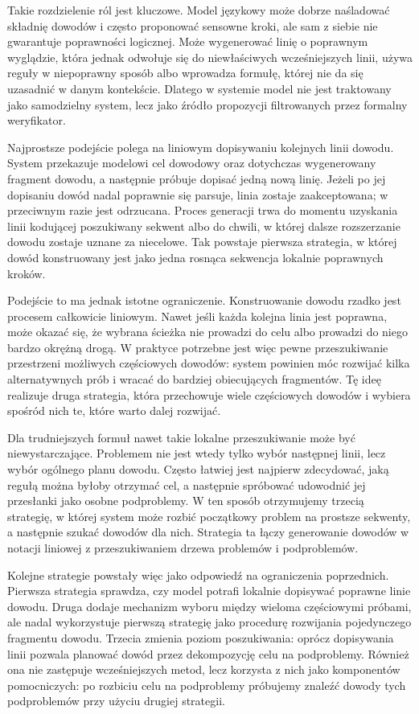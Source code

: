 \documentclass[shortabstract]{iithesis}
\theoremstyle{definition}
\theoremstyle{remark}
\theoremstyle{plain}
\begin{document}
Takie rozdzielenie ról jest kluczowe. Model językowy może dobrze naśladować składnię
dowodów i często proponować sensowne kroki, ale sam z siebie nie gwarantuje
poprawności logicznej. Może wygenerować linię o poprawnym wyglądzie, która jednak
odwołuje się do niewłaściwych wcześniejszych linii, używa reguły w niepoprawny
sposób albo wprowadza formułę, której nie da się uzasadnić w danym kontekście.
Dlatego w systemie model nie jest traktowany jako samodzielny system, lecz jako źródło
propozycji filtrowanych przez formalny weryfikator.

Najprostsze podejście polega na liniowym dopisywaniu kolejnych linii dowodu.
System przekazuje modelowi cel dowodowy oraz dotychczas wygenerowany fragment
dowodu, a następnie próbuje dopisać jedną nową linię. Jeżeli po jej dopisaniu dowód
nadal poprawnie się parsuje, linia zostaje zaakceptowana; w przeciwnym razie jest
odrzucana. Proces generacji trwa do momentu uzyskania linii kodującej poszukiwany
sekwent albo do chwili, w której dalsze rozszerzanie dowodu zostaje uznane za
niecelowe. Tak powstaje pierwsza strategia, w której dowód konstruowany jest jako
jedna rosnąca sekwencja lokalnie poprawnych kroków.

Podejście to ma jednak istotne ograniczenie. Konstruowanie dowodu rzadko jest
procesem całkowicie liniowym. Nawet jeśli każda kolejna linia jest poprawna, może
okazać się, że wybrana ścieżka nie prowadzi do celu albo prowadzi do niego bardzo
okrężną drogą. W praktyce potrzebne jest więc pewne przeszukiwanie przestrzeni
możliwych częściowych dowodów: system powinien móc rozwijać kilka alternatywnych
prób i wracać do bardziej obiecujących fragmentów. Tę ideę realizuje druga
strategia, która przechowuje wiele częściowych dowodów i wybiera spośród nich te,
które warto dalej rozwijać.

Dla trudniejszych formuł nawet takie lokalne przeszukiwanie może być niewystarczające.
Problemem nie jest wtedy tylko wybór następnej linii, lecz wybór ogólnego planu
dowodu. Często łatwiej jest najpierw zdecydować, jaką regułą można byłoby otrzymać
cel, a następnie spróbować udowodnić jej przesłanki jako osobne podproblemy. W ten
sposób otrzymujemy trzecią strategię, w której system może rozbić początkowy
problem na prostsze sekwenty, a następnie szukać dowodów dla nich. Strategia ta
łączy generowanie dowodów w notacji liniowej z przeszukiwaniem drzewa problemów
i podproblemów.

Kolejne strategie powstały więc jako odpowiedź na ograniczenia poprzednich.
Pierwsza strategia sprawdza, czy model potrafi lokalnie dopisywać poprawne linie
dowodu. Druga dodaje mechanizm wyboru między wieloma częściowymi próbami,
ale nadal wykorzystuje pierwszą strategię jako procedurę rozwijania pojedynczego
fragmentu dowodu. Trzecia zmienia poziom poszukiwania: oprócz dopisywania linii
pozwala planować dowód przez dekompozycję celu na podproblemy. Również ona nie
zastępuje wcześniejszych metod, lecz korzysta z nich jako komponentów pomocniczych:
po rozbiciu celu na podproblemy próbujemy znaleźć dowody tych podproblemów przy 
użyciu drugiej strategii.
\end{document}
